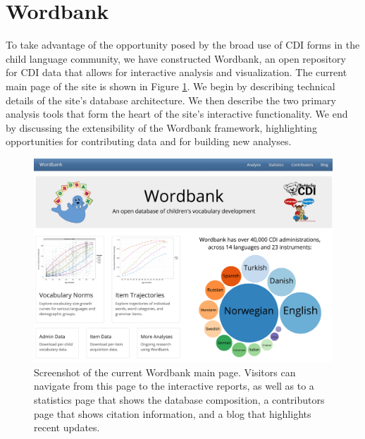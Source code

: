 \documentclass[doc,noapacite]{apa2}
\begin{document}
\section{Wordbank}

To take advantage of the opportunity posed by the broad use of CDI forms in the child language community, we have constructed Wordbank, an open repository for CDI data that allows for interactive analysis and visualization. The current main page of the site is shown in Figure \ref{fig:screenshot}. We begin by describing technical details of the site's database architecture. We then describe the two primary analysis tools that form the heart of the site's interactive functionality. We end by discussing the extensibility of the Wordbank framework, highlighting opportunities for contributing data and for building new analyses. 


\begin{figure}[h!]
\includegraphics[width=6.4in]{figures/screenshot.png}
\caption{\label{fig:screenshot} Screenshot of the current Wordbank main page. Visitors can navigate from this page to the interactive reports, as well as to a statistics page that shows the database composition, a contributors page that shows citation information, and a blog that highlights recent updates.}
\end{figure}
\end{document}
